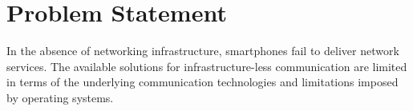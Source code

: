 \section{Problem Statement}

In the absence of networking infrastructure, smartphones fail to deliver
network services. The available solutions for infrastructure-less communication
are limited in terms of the underlying communication technologies and
limitations imposed by operating systems.